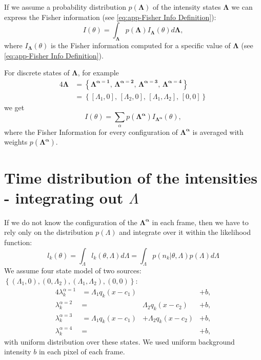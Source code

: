 If we assume a probability distribution $p(\bm{\Lambda})$  of the intensity states $\bm{\Lambda}$ we can express the Fisher information (see \autoref{eq:app-Fisher Info Definition}):
%
\begin{equation}
	I(\theta) = \int_{\bm{\Lambda}}p(\bm{\Lambda})I_{\bm{\Lambda}}(\theta)d\bm{\Lambda},
\end{equation}
%
where $I_{\bm{\Lambda}}(\theta)$ is the Fisher information computed for a specific value of $\bm{\Lambda}$ (see \autoref{eq:app-Fisher Info Definition}).

For discrete states of $\bm{\Lambda}$, for example  
%
\begin{alignat}{4}
	\bm{\Lambda}
	&=\left\{\bm{\Lambda^{\alpha=1}},\,\bm{\Lambda^{\alpha=2}},\,\bm{\Lambda^{\alpha=3}},\,\bm{\Lambda^{\alpha=4}}\right\}\\
	&=\left\{[\Lambda_1,0],\,[\Lambda_2,0],\,[\Lambda_1,\Lambda_2],\,[0,0]\right\}
\end{alignat}	
% 
we get
\begin{equation}
	I(\theta)=\sum_{\alpha}p(\bm{\Lambda^\alpha})I_{\bm{\Lambda^\alpha}}(\theta),
\end{equation}
%
where the Fisher Information for every configuration of $\bm{\Lambda^\alpha}$ is averaged with weights $p(\bm{\Lambda^\alpha})$. 


\section{Time distribution of the intensities - integrating out $\Lambda$}
\label{sub:Appendix Time-distribution-Integrating out}
If we do not know the configuration of the $\bm{\Lambda^\alpha}$ in each frame, then we have to rely only on the distribution $p(\Lambda)$ and integrate over it within the likelihood function:
%
\begin{equation}
	l_k(\theta)=\int_{\Lambda}l_k(\theta,\Lambda)d\Lambda=\int_{\Lambda}p(n_k|\theta,\Lambda)p(\Lambda)d\Lambda
	\label{eq:app-log lik - int out}
\end{equation}
%
We assume four state model of two sources: $\left\{ (\Lambda_1,0),(0,\Lambda_2),(\Lambda_1,\Lambda_2),(0,0)\right\}$: 
%
\begin{alignat}{4}
	\lambda_k^{\alpha=1}&=\Lambda_1q_k(x-c_1) & &+b,\\ 
	\lambda_k^{\alpha=2}&=&\Lambda_2q_k(x-c_2) &+b,\\ 
	\lambda_k^{\alpha=3}&=\Lambda_1q_k(x-c_1)&+\Lambda_2q_k(x-c_2)&+b,\\ 
	\lambda_k^{\alpha=4}&=& &+b,
\end{alignat}
%
with uniform distribution over these states. We used uniform background intensity $b$ in each pixel of each frame. 

